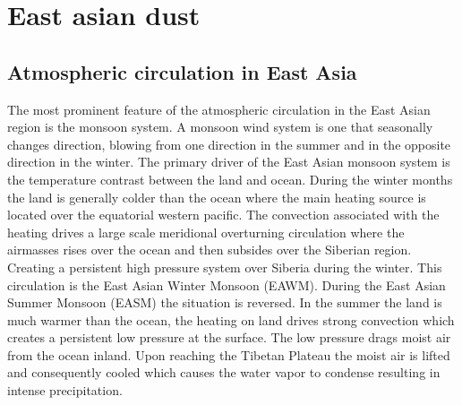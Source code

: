 



\section{East asian dust}

\subsection{Atmospheric circulation in East Asia}
The most prominent feature of the atmospheric circulation in the East Asian region is the monsoon system. A monsoon wind system is one that seasonally changes direction, blowing from one direction in the summer and in the opposite direction in the winter. The primary driver of the East Asian monsoon system is the temperature contrast between the land and ocean. During the winter months the land is generally colder than the ocean where the main heating source is located over the equatorial western pacific. The convection associated with the heating drives a large scale meridional overturning circulation where the airmasses rises over the ocean and then subsides over the Siberian region. Creating a persistent high pressure system over Siberia during the winter. This circulation is the East Asian Winter Monsoon (EAWM). During the East Asian Summer Monsoon (EASM) the situation is reversed. In the summer the land is much warmer than the ocean, the heating on land drives strong convection which creates a persistent low pressure at the surface. The low pressure drags moist air from the ocean inland. Upon reaching the Tibetan Plateau the moist air is lifted and consequently cooled which causes the water vapor to condense resulting in intense precipitation. 

